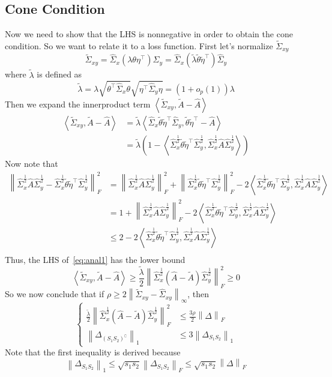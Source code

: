 \documentclass[12pt]{article}
\newcommand{\lam}{\lambda}
\newcommand{\com}{^\complement}
\newcommand{\tp}{^\top}
\newcommand{\bra}[1]{\left(#1\right)}
\newcommand{\innprod}[1]{\left\langle#1\right\rangle}
\newcommand{\norm}[1]{\left\|#1\right\|}
\newcommand{\wh}[1]{\widehat{#1}}
\newcommand{\wt}[1]{\widetilde{#1}}
\newcommand{\srt}{^{\frac{1}{2}}}
\def\beq{\begin{equation}}
\def\eeq{\end{equation}}
\def\bal{\begin{aligned}}
\def\eal{\end{aligned}}
\def\beqal{\begin{equation}\begin{aligned}}
\def\eeqal{\end{aligned}\end{equation}}
\newcommand{\mtline}[1]{\beq
\left\{
\bal
#1
\eal
\right.
\eeq}
\begin{document}
\subsection{Cone Condition}
Now we need to show that the LHS is nonnegative in order to obtain the cone condition. So we want to relate it to a loss function. First let's normalize $\wt{\Sigma}_{xy}$
\beq
\wt{\Sigma}_{xy}=\wh{\Sigma}_x(\lam\theta\eta\tp)\wh{\Sigma}_y=\wh{\Sigma}_x(\wt{\lam}\wt{\theta}\wt{\eta}\tp)\wh{\Sigma}_y
\eeq
where $\wt{\lam}$ is defined as
\beq
\wt{\lam}=\lam \sqrt{\theta\tp\wh{\Sigma}_x\theta}\sqrt{\eta\tp\wh{\Sigma}_y\eta}=(1+o_p(1))\lam
\eeq
Then we expand the innerproduct term $\innprod{\wt{\Sigma}_{xy}, \wt{A}-\wh{A}}$
\beqal
\innprod{\wt{\Sigma}_{xy}, \wt{A}-\wh{A}}&=\wt{\lam}\innprod{\wh{\Sigma}_x\wt{\theta}\wt{\eta}\tp \wh{\Sigma}_y,\wt{\theta}\wt{\eta}\tp-\wh{A}}\\
&=\wt{\lam}\bra{1-\innprod{ \wh{\Sigma}_x\srt\wt{\theta}\wt{\eta}\tp \wh{\Sigma}_y\srt,  \wh{\Sigma}_x\srt\wh{A}\wh{\Sigma}_y\srt}}
\eeqal
Now note that
\beqal
\norm{\wh{\Sigma}_x\srt\wh{A}\wh{\Sigma}_y\srt- \wh{\Sigma}_x\srt\wt{\theta}\wt{\eta}\tp \wh{\Sigma}_y\srt }_F^2 &= \norm{\wh{\Sigma}_x\srt\wh{A}\wh{\Sigma}_y\srt}_F^2+\norm{\wh{\Sigma}_x\srt\wt{\theta}\wt{\eta}\tp \wh{\Sigma}_y\srt}_F^2-2\innprod{ \wh{\Sigma}_x\srt\wt{\theta}\wt{\eta}\tp \wh{\Sigma}_y\srt,  \wh{\Sigma}_x\srt\wh{A}\wh{\Sigma}_y\srt}\\
&=1+\norm{\wh{\Sigma}_x\srt\wh{A}\wh{\Sigma}_y\srt}_F^2-2\innprod{ \wh{\Sigma}_x\srt\wt{\theta}\wt{\eta}\tp \wh{\Sigma}_y\srt,  \wh{\Sigma}_x\srt\wh{A}\wh{\Sigma}_y\srt}\\
&\leq 2-2\innprod{ \wh{\Sigma}_x\srt\wt{\theta}\wt{\eta}\tp \wh{\Sigma}_y\srt,  \wh{\Sigma}_x\srt\wh{A}\wh{\Sigma}_y\srt}\\
\eeqal
Thus, the LHS of~\ref{eq:anal1} has the lower bound
\beq
\innprod{\wt{\Sigma}_{xy}, \wt{A}-\wh{A}}\geq \frac{\wt{\lam}}{2}\norm{\wh{\Sigma}_x\srt(\wh{A}-\wt{A})\wh{\Sigma}_y\srt}_F^2\geq 0
\eeq
So we now conclude that if $\rho \geq 2\norm{ \wt{\Sigma}_{xy}-\wh{\Sigma}_{xy} }_\infty$, then
\mtline{\label{eq:conecondition}
\frac{\wt{\lam}}{2}\norm{\wh{\Sigma}_x\srt(\wh{A}-\wt{A})\wh{\Sigma}_y\srt}_F^2&\leq \frac{3\rho }{2}\norm{\Delta}_F\\
\norm{\Delta_{(S_1S_2)\com}}_1&\leq 3\norm{\Delta_{S_1S_2}}_1
}
Note that the first inequality is derived because
\beq
\norm{\Delta_{S_1S_2}}_1\leq \sqrt{s_1s_2}\norm{\Delta_{S_1S_2}}_F\leq\sqrt{s_1s_2}\norm{\Delta}_F
\eeq
\end{document}
